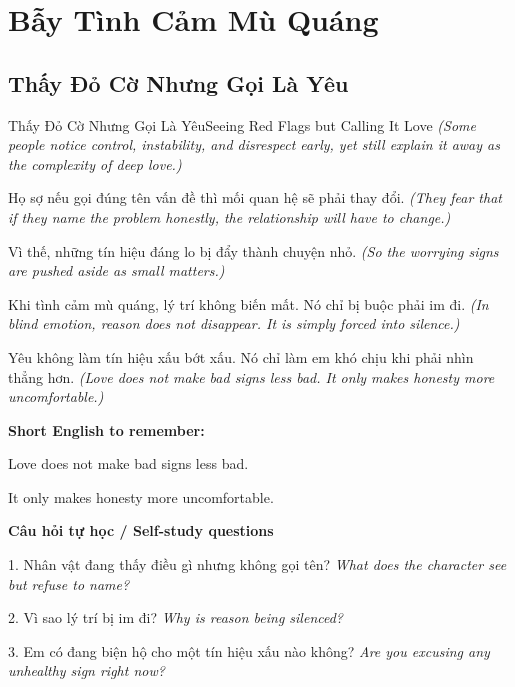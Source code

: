 \chapter{Bẫy Tình Cảm Mù Quáng}

\section{Thấy Đỏ Cờ Nhưng Gọi Là Yêu}
\begin{truyen}{Thấy Đỏ Cờ Nhưng Gọi Là Yêu}{Seeing Red Flags but Calling It Love}
\textit{(Some people notice control, instability, and disrespect early, yet still explain it away as the complexity of deep love.)}

Họ sợ nếu gọi đúng tên vấn đề thì mối quan hệ sẽ phải thay đổi.
\textit{(They fear that if they name the problem honestly, the relationship will have to change.)}

Vì thế, những tín hiệu đáng lo bị đẩy thành chuyện nhỏ.
\textit{(So the worrying signs are pushed aside as small matters.)}

Khi tình cảm mù quáng, lý trí không biến mất. Nó chỉ bị buộc phải im đi.
\textit{(In blind emotion, reason does not disappear. It is simply forced into silence.)}

\end{truyen}

\begin{baihoc}
Yêu không làm tín hiệu xấu bớt xấu. Nó chỉ làm em khó chịu khi phải nhìn thẳng hơn.
\textit{(Love does not make bad signs less bad. It only makes honesty more uncomfortable.)}
\end{baihoc}

\begin{ghinhoanh}
\textbf{Short English to remember:}

Love does not make bad signs less bad.

It only makes honesty more uncomfortable.

\end{ghinhoanh}

\begin{tuhocnhanh}
\textbf{Câu hỏi tự học / Self-study questions}

1. Nhân vật đang thấy điều gì nhưng không gọi tên? \textit{What does the character see but refuse to name?}

2. Vì sao lý trí bị im đi? \textit{Why is reason being silenced?}

3. Em có đang biện hộ cho một tín hiệu xấu nào không? \textit{Are you excusing any unhealthy sign right now?}
\end{tuhocnhanh}
\ngancach

